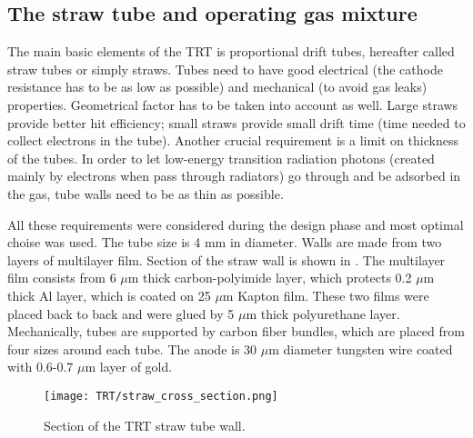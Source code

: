 \subsection{The straw tube and operating gas mixture}

The main basic elements of the TRT is proportional drift tubes, hereafter called straw tubes or simply straws.
Tubes need to have good electrical (the cathode resistance has to be as low as possible) and mechanical (to avoid gas leaks) properties.
Geometrical factor has to be taken into account as well. Large straws provide better hit efficiency; small straws provide small drift time (time needed to collect electrons in the tube).
Another crucial requirement is a limit on thickness of the tubes. 
In order to let low-energy transition radiation photons (created mainly by electrons when pass through radiators) go through and be adsorbed in the gas, tube walls need to be as thin as possible.

All these requirements were considered during the design phase and most optimal choise was used.
The tube size is 4 mm in diameter. Walls are made from two layers of multilayer film. Section of the straw wall is shown in .
The multilayer film consists from 6 $\mu$m thick carbon-polyimide layer, which protects 0.2 $\mu$m thick Al layer, which is coated on 25 $\mu$m Kapton film.
These two films were placed back to back and were glued by 5 $\mu$m thick polyurethane layer.
Mechanically, tubes are supported by carbon fiber bundles, which are placed from four sizes around each tube.
The anode is 30 $\mu$m diameter tungsten wire coated with 0.6-0.7 $\mu$m layer of gold.

\begin{figure}
\centering
\texttt{[image: TRT/straw\_cross\_section.png]}
\caption{ 
Section of the TRT straw tube wall.
}
\label{fig:straw_wall_section}
\end{figure}

